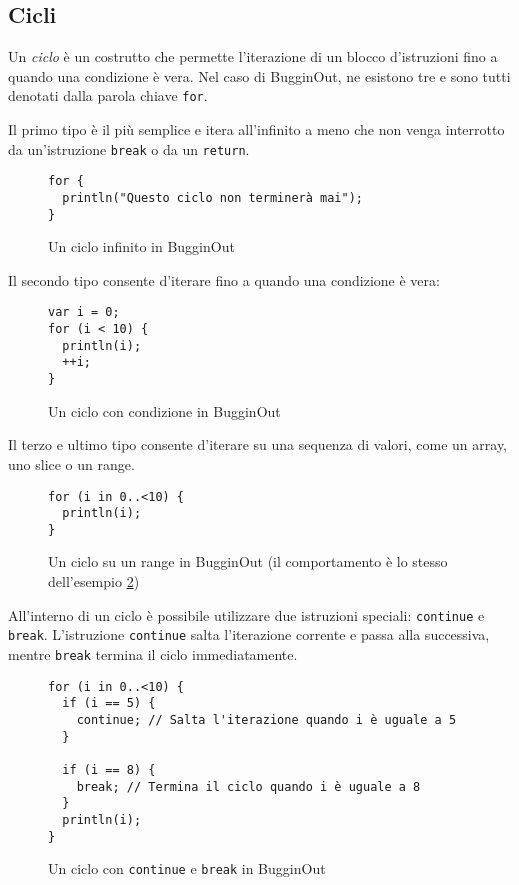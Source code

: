 \subsection{Cicli}

Un \emph{ciclo} \`e un costrutto che permette l'iterazione di un blocco d'istruzioni fino a quando una condizione \`e vera. Nel caso di BugginOut, ne esistono tre e sono tutti denotati dalla parola chiave \texttt{for}.

Il primo tipo \`e il pi\`u semplice e itera all'infinito a meno che non venga interrotto da un'istruzione \texttt{break} o da un \texttt{return}.
\begin{figure}[H]
	\centering
	\begin{verbatim}
for {
  println("Questo ciclo non terminerà mai");
}
	\end{verbatim}
	\caption{Un ciclo infinito in BugginOut}
	\label{fig:infinite-for-example}
\end{figure}

Il secondo tipo consente d'iterare fino a quando una condizione \`e vera:
\begin{figure}[H]
	\centering
	\begin{verbatim}
var i = 0;
for (i < 10) {
  println(i);
  ++i;
}
	\end{verbatim}
	\caption{Un ciclo con condizione in BugginOut}
	\label{fig:for-with-condition-example}
\end{figure}

Il terzo e ultimo tipo consente d'iterare su una sequenza di valori, come un array, uno slice o un range.
\begin{figure}[H]
	\centering
	\begin{verbatim}
for (i in 0..<10) {
  println(i);
}
	\end{verbatim}
	\caption{Un ciclo su un range in BugginOut (il comportamento \`e lo stesso dell'esempio \ref{fig:for-with-condition-example})}
	\label{fig:for-range-example}
\end{figure}

All'interno di un ciclo \`e possibile utilizzare due istruzioni speciali: \texttt{continue} e \texttt{break}. L'istruzione \texttt{continue} salta l'iterazione corrente e passa alla successiva, mentre \texttt{break} termina il ciclo immediatamente.

\begin{figure}[H]
	\centering
	\begin{verbatim}
for (i in 0..<10) {
  if (i == 5) {
    continue; // Salta l'iterazione quando i è uguale a 5
  }

  if (i == 8) {
    break; // Termina il ciclo quando i è uguale a 8
  }
  println(i);
}
	\end{verbatim}
	\caption{Un ciclo con \texttt{continue} e \texttt{break} in BugginOut}
	\label{fig:for-continue-break-example}
\end{figure}

